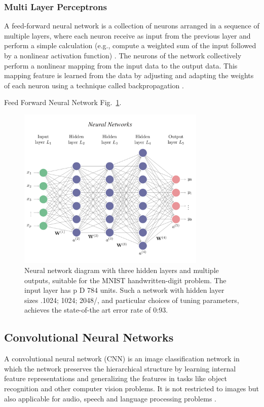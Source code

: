 \subsubsection*{Multi Layer Perceptrons}

A feed-forward neural network is a collection of neurons arranged in a sequence of multiple layers, where each neuron receive as input from the previous layer and perform a simple calculation (e.g., compute a weighted sum of the input followed by a nonlinear activation function) \cite{efron2016computer}. The neurons of the network collectively perform a nonlinear mapping from the input data to the output data. This mapping feature is learned from the data by adjusting and adapting the weights of each neuron using a technique called backpropagation \cite{efron2016computer}.

Feed Forward Neural Network Fig.~\ref{fig:multi-layer}.
\begin{figure}[htbp]
\centering
\includegraphics[width=0.8\textwidth]{images/NN.png}
\caption{Neural network diagram with three hidden layers and multiple outputs, suitable for the MNIST handwritten-digit problem. The input layer has p D 784 units. Such a network with hidden layer sizes .1024; 1024; 2048/, and particular choices of tuning parameters, achieves the state-of-the art error rate of 0:93.}
\label{fig:multi-layer}
\end{figure}


\subsection{Convolutional Neural Networks}
A convolutional neural network (CNN) is an image classification network in which the network preserves the hierarchical structure by learning internal feature representations and generalizing the features in tasks like object recognition and other computer vision problems. It is not restricted to images but also applicable for audio, speech and language processing problems \cite{Manaswi2018}.

